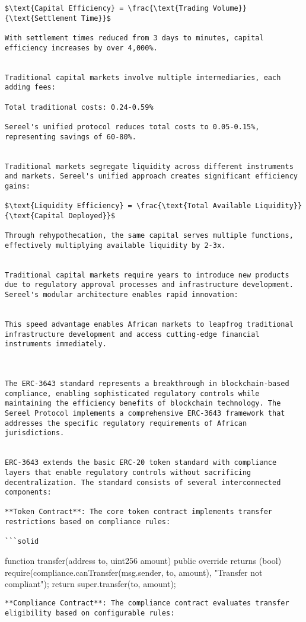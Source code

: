 \documentclass[12pt]{article}
\begin{document}
{{\begin{itemize}
\begin{lstlisting}
$\text{Capital Efficiency} = \frac{\text{Trading Volume}}{\text{Settlement Time}}$

With settlement times reduced from 3 days to minutes, capital efficiency increases by over 4,000%.


Traditional capital markets involve multiple intermediaries, each adding fees:

Total traditional costs: 0.24-0.59%

Sereel's unified protocol reduces total costs to 0.05-0.15%, representing savings of 60-80%.


Traditional markets segregate liquidity across different instruments and markets. Sereel's unified approach creates significant efficiency gains:

$\text{Liquidity Efficiency} = \frac{\text{Total Available Liquidity}}{\text{Capital Deployed}}$

Through rehypothecation, the same capital serves multiple functions, effectively multiplying available liquidity by 2-3x.


Traditional capital markets require years to introduce new products due to regulatory approval processes and infrastructure development. Sereel's modular architecture enables rapid innovation:


This speed advantage enables African markets to leapfrog traditional infrastructure development and access cutting-edge financial instruments immediately.



The ERC-3643 standard represents a breakthrough in blockchain-based compliance, enabling sophisticated regulatory controls while maintaining the efficiency benefits of blockchain technology. The Sereel Protocol implements a comprehensive ERC-3643 framework that addresses the specific regulatory requirements of African jurisdictions.


ERC-3643 extends the basic ERC-20 token standard with compliance layers that enable regulatory controls without sacrificing decentralization. The standard consists of several interconnected components:

**Token Contract**: The core token contract implements transfer restrictions based on compliance rules:

```solid
\end{lstlisting}
function transfer(address to, uint256 amount) public override returns (bool) {    require(compliance.canTransfer(msg.sender, to, amount), "Transfer not compliant");    return super.transfer(to, amount);}
\begin{lstlisting}
**Compliance Contract**: The compliance contract evaluates transfer eligibility based on configurable rules:


\end{lstlisting}
\end{itemize}}}
\end{document}
